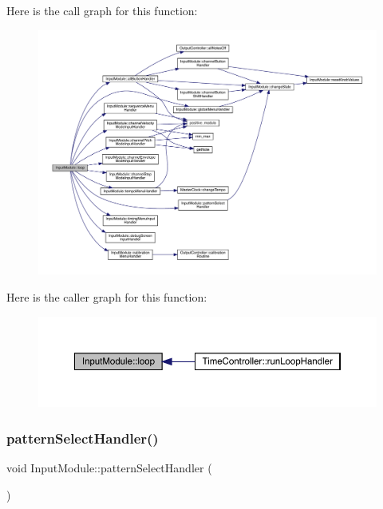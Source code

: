 Here is the call graph for this function\+:
\nopagebreak
\begin{figure}[H]
\begin{center}
\leavevmode
\includegraphics[width=350pt]{class_input_module_ad481ab7241ffe3a168e063a5afd6d892_cgraph}
\end{center}
\end{figure}
Here is the caller graph for this function\+:
\nopagebreak
\begin{figure}[H]
\begin{center}
\leavevmode
\includegraphics[width=350pt]{class_input_module_ad481ab7241ffe3a168e063a5afd6d892_icgraph}
\end{center}
\end{figure}
\mbox{\label{class_input_module_a92fa77f3667cbfdce6c2fbdc14854811}} 
\subsubsection{\texorpdfstring{pattern\+Select\+Handler()}{patternSelectHandler()}}
{\footnotesize\ttfamily void Input\+Module\+::pattern\+Select\+Handler (\begin{DoxyParamCaption}{ }\end{DoxyParamCaption})}

